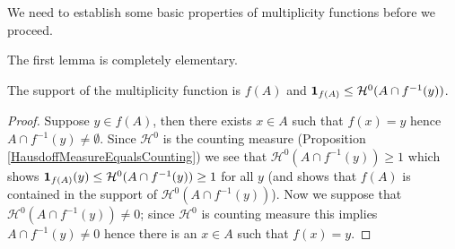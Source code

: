 We need to establish some basic properties of multiplicity functions before we proceed.

The first lemma is completely elementary.
\begin{lem}\label{SupportOfMultiplicityFunction}The support of the multiplicity function is $f(A)$ and $\textbf{1}_{f(A)} \leq \mathcal{H}^0( A \cap f^{-1} (y))$.
\end{lem}
\begin{proof}
Suppose $y \in f(A)$, then there exists $x \in A$ such that $f(x) = y$ hence $A \cap f^{-1}(y) \neq \emptyset$.  Since $\mathcal{H}^0$ is the counting measure (Proposition \ref{HausdoffMeasureEqualsCounting}) we see that $\mathcal{H}^0(A \cap f^{-1}(y)) \geq 1$ which shows $\textbf{1}_{f(A)}(y) \leq \mathcal{H}^0(A \cap f^{-1}(y)) \geq 1$ for all $y$ (and shows that $f(A)$ is contained in the support of $\mathcal{H}^0(A \cap f^{-1}(y))$).
Now we suppose that $\mathcal{H}^0(A \cap f^{-1}(y)) \neq 0$; since $\mathcal{H}^0$ is counting measure this implies $A \cap f^{-1}(y) \neq 0$ hence there is an $x \in A$ such that $f(x) = y$.
\end{proof}

